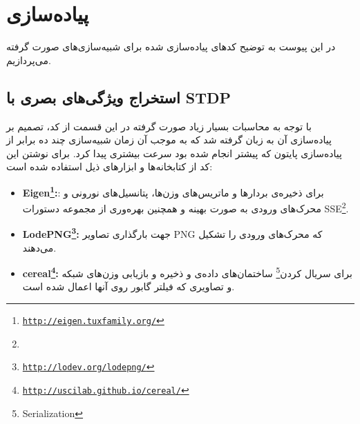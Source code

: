 \chapter{پیاده‌سازی} \label{Peyvaste1}
در این پیوست به توضیح کدهای پیاده‌سازی شده برای شبیه‌سازی‌های صورت گرفته می‌پردازیم. 

\section{استخراج ویژگی‌های بصری با STDP}
با توجه به محاسبات بسیار زیاد صورت گرفته در این قسمت از کد، تصمیم بر پیاده‌سازی آن به زبان  گرفته شد که به موجب آن زمان شبیه‌سازی چند ده برابر از پیاده‌سازی پایتون که پیشتر انجام شده بود سرعت بیشتری پیدا کرد. برای نوشتن این کد از کتابخانه‌ها و ابزارهای ذیل استفاده شده است:



\begin{itemize}
\item 
\textbf{Eigen\footnote{\href{http://eigen.tuxfamily.org/}{\texttt{http://eigen.tuxfamily.org/}}}:}: برای ذخیره‌ی بردارها و ماتریس‌های وزن‌ها، پتانسیل‌های نورونی و محرک‌های ورودی به صورت بهینه و همچنین بهره‌وری از مجموعه دستورات SSE\footnote{}.
\item
\textbf{LodePNG\footnote{\href{http://lodev.org/lodepng/}{\texttt{http://lodev.org/lodepng/}}}:}
جهت بارگذاری تصاویر PNG که محرک‌های ورودی را تشکیل می‌دهند.

\item
\textbf{cereal\footnote{\href{http://uscilab.github.io/cereal/}{\texttt{http://uscilab.github.io/cereal/}}}:}
برای سریال کردن\footnote{Serialization} ساختمان‌های داده‌ی  و ذخیره و بازیابی وزن‌های شبکه و تصاویری که فیلتر گابور روی آنها اعمال شده است.
\end{itemize}

\newcommand{\Cinline}[1]{\lr{\lstinline{#1}}}

